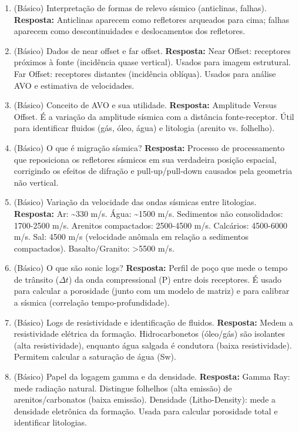 \documentclass[11pt,a4paper]{article}
\begin{document}
\begin{enumerate}
  \item (Básico) Interpretação de formas de relevo sísmico (anticlinas, falhas).
  \textbf{Resposta:} Anticlinas aparecem como refletores arqueados para cima; falhas aparecem como descontinuidades e deslocamentos dos refletores.

  \item (Básico) Dados de near offset e far offset.
  \textbf{Resposta:} Near Offset: receptores próximos à fonte (incidência quase vertical). Usados para imagem estrutural. Far Offset: receptores distantes (incidência oblíqua). Usados para análise AVO e estimativa de velocidades.

  \item (Básico) Conceito de AVO e sua utilidade.
  \textbf{Resposta:} Amplitude Versus Offset. É a variação da amplitude sísmica com a distância fonte-receptor. Útil para identificar fluidos (gás, óleo, água) e litologia (arenito vs. folhelho).

  \item (Básico) O que é migração sísmica?
  \textbf{Resposta:} Processo de processamento que reposiciona os refletores sísmicos em sua verdadeira posição espacial, corrigindo os efeitos de difração e pull-up/pull-down causados pela geometria não vertical.

  \item (Básico) Variação da velocidade das ondas sísmicas entre litologias.
  \textbf{Resposta:} Ar: \textasciitilde330 m/s. Água: \textasciitilde1500 m/s. Sedimentos não consolidados: 1700-2500 m/s. Arenitos compactados: 2500-4500 m/s. Calcários: 4500-6000 m/s. Sal: 4500 m/s (velocidade anômala em relação a sedimentos compactados). Basalto/Granito: >5500 m/s.

  \item (Básico) O que são sonic logs?
  \textbf{Resposta:} Perfil de poço que mede o tempo de trânsito ($\Delta t$) da onda compressional (P) entre dois receptores. É usado para calcular a porosidade (junto com um modelo de matriz) e para calibrar a sísmica (correlação tempo-profundidade).

  \item (Básico) Logs de resistividade e identificação de fluidos.
  \textbf{Resposta:} Medem a resistividade elétrica da formação. Hidrocarbonetos (óleo/gás) são isolantes (alta resistividade), enquanto água salgada é condutora (baixa resistividade). Permitem calcular a saturação de água (Sw).

  \item (Básico) Papel da logagem gamma e da densidade.
  \textbf{Resposta:} Gamma Ray: mede radiação natural. Distingue folhelhos (alta emissão) de arenitos/carbonatos (baixa emissão). Densidade (Litho-Density): mede a densidade eletrônica da formação. Usada para calcular porosidade total e identificar litologias.


\end{enumerate}
\end{document}
